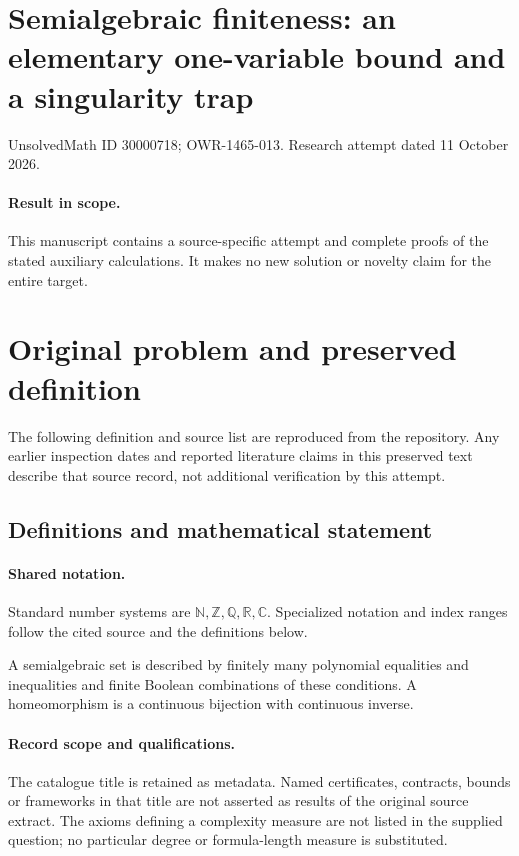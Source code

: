 \documentclass[11pt]{article}
\begin{document}
\section*{Semialgebraic finiteness: an elementary one-variable bound and a singularity trap}
\noindent UnsolvedMath ID 30000718; OWR-1465-013. Research attempt dated 11 October 2026.
\paragraph{Result in scope.}This manuscript contains a source-specific attempt and complete proofs of the stated auxiliary calculations. It makes no new solution or novelty claim for the entire target.
\section{Original problem and preserved definition}
The following definition and source list are reproduced from the repository. Any earlier inspection dates and reported literature claims in this preserved text describe that source record, not additional verification by this attempt.
\subsection{Definitions and mathematical statement}

\paragraph{Shared notation.}Standard number systems are $\mathbb N,\mathbb Z,\mathbb Q,\mathbb R,\mathbb C$. Specialized notation and index ranges follow the cited source and the definitions below.


A semialgebraic set is described by finitely many polynomial equalities and inequalities and finite Boolean combinations of these conditions. A homeomorphism is a continuous bijection with continuous inverse.
\paragraph{Record scope and qualifications.}
The catalogue title is retained as metadata. Named certificates, contracts, bounds or frameworks in that title are not asserted as results of the original source extract.
The axioms defining a complexity measure are not listed in the supplied question; no particular degree or formula-length measure is substituted.
\end{document}
